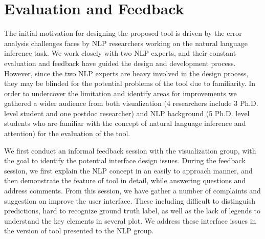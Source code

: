 \section{Evaluation and Feedback}

The initial motivation for designing the proposed tool is driven by the error analysis challenges faces by NLP researchers working on the natural language inference task. We work closely with two NLP experts, and their constant evaluation and feedback have guided the design and development process.
%
However, since the two NLP experts are heavy involved in the design process, they may be blinded for the potential problems of the tool due to familiarity.  In order to undercover the limitation and identify areas for improvements we gathered a wider audience from both visualization (4 researchers include 3 Ph.D. level student and one postdoc researcher) and NLP background (5 Ph.D. level students who are familiar with the concept of natural language inference and attention) for the evaluation of the tool.  

We first conduct an informal feedback session with the visualization group, with the goal to identify the potential interface design issues. During the feedback session, we first explain the NLP concept in an easily to approach manner, and then demonstrate the feature of tool in detail, while answering questions and address comments.
%
From this session, we have gather a number of complaints and suggestion on improve the user interface. These  including difficult to distinguish predictions, hard to recognize ground truth label, as well as the lack of legends to understand the key elements in several plot. We address these interface issues in the version of tool presented to the NLP group.


